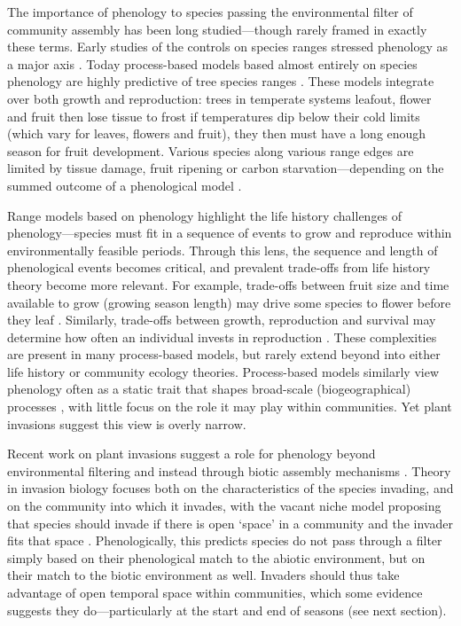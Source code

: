 \documentclass[11pt]{article}
\begin{document}
The importance of phenology to species passing the environmental filter of community assembly has been long studied---though rarely framed in exactly these terms. Early studies of the controls on species ranges stressed phenology as a major axis \citep{salisbury1926geographical}. Today process-based models based almost entirely on species phenology are highly predictive of tree species ranges \citep[where they have been tested,][]{chuineJTB,Morin:2009gt,morin2007}. These models integrate over both growth and reproduction: trees in temperate systems leafout, flower and fruit then lose tissue to frost if temperatures dip below their cold limits (which vary for leaves, flowers and fruit), they then must have a long enough season for fruit development. Various species along various range edges are limited by tissue damage, fruit ripening or carbon starvation---depending on the summed outcome of a phenological model \citep{Chuine:2010gm}. 

Range models based on phenology highlight the life history challenges of phenology---species must fit in a sequence of events to grow and reproduce within environmentally feasible periods. Through this lens, the sequence and length of phenological events becomes critical, and prevalent trade-offs from life history theory become more relevant. For example, trade-offs between fruit size and time available to grow (growing season length) may drive some species to flower before they leaf \citep{dan2021nph}. Similarly, trade-offs between growth, reproduction and survival may determine how often an individual invests in reproduction \citep{schaffer1974optimal,law1979cost,stearns1998evolution}. These complexities are present in many process-based models, but rarely extend beyond into either life history or community ecology theories. Process-based models similarly view phenology often as a static trait that shapes broad-scale (biogeographical) processes \citep{Chuine:2010gm}, with little focus on the role it may play within communities. Yet plant invasions suggest this view is overly narrow.

Recent work on plant invasions suggest a role for phenology beyond environmental filtering and instead through biotic assembly mechanisms \citep{wolkovich2011phenology,Fridley:2012fj}. Theory in invasion biology focuses both on the characteristics of the species invading, and on the community into which it invades, with the vacant niche model proposing that species should invade if there is open `space' in a community and the invader fits that space \citep{Elton:1958bk}. Phenologically, this predicts species do not pass through a filter simply based on their phenological match to the abiotic environment, but on their match to the biotic environment as well. Invaders should thus take advantage of open temporal space within communities, which some evidence suggests they do---particularly at the start and end of seasons (see next section). 
\end{document}
